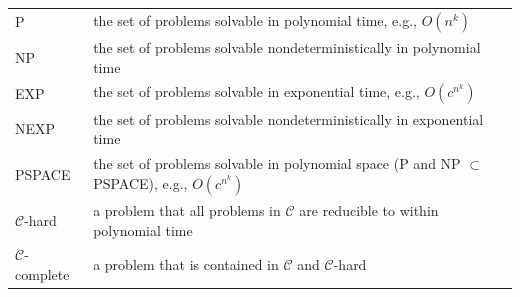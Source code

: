 \documentclass{article} %
\begin{document}
\begin{table}[h!] \label{tab:complexitydefinition}
    \begin{tabular}{ll}
    \hline \hline
        P & the set of problems solvable in polynomial time, e.g., $O(n^k)$\\
        NP & the set of problems solvable nondeterministically in polynomial time \\
        EXP & the set of problems solvable in exponential time, e.g., $O(c^{n^k})$\\
        NEXP & the set of problems solvable nondeterministically in exponential time\\
        PSPACE & the set of problems solvable in polynomial space (P and NP $\subset$ PSPACE), e.g., $O(c^{n^k})$\\
        $\mathcal{C}$-hard & a problem that all problems in $\mathcal{C}$ are reducible to within  polynomial time\\
        $\mathcal{C}$-complete & a problem that is contained in $\mathcal{C}$ and $\mathcal{C}$-hard\\
    \hline \hline
    \end{tabular}
\end{table}
\end{document}
